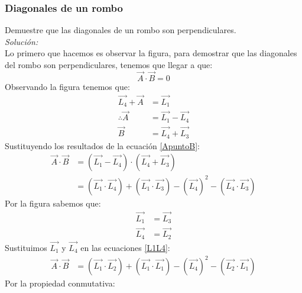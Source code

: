 \documentclass[12pt,openany]{book}
\begin{document}
			\subsubsection{Diagonales de un rombo}
				Demuestre que las diagonales de un rombo son perpendiculares.\\
				\noindent\textsl{Soluci\'on:}\\
				Lo primero que hacemos es observar la figura, para demostrar que las diagonales del rombo
				son perpendiculares, tenemos que llegar a que:
				$$
					\vec{A}\cdot\vec{B}=0
				$$
				Observando la figura tenemos que:
				\begin{equation}
					\begin{split}
						\vec{L_{4}}+\vec{A}&=\vec{L_{1}}\\
						\therefore \vec{A}&=\vec{L_{1}}-\vec{L_{4}}\\
						\vec{B}&=\vec{L_{4}}+\vec{L_{3}}
					\end{split}
					\label{ApuntoB}
				\end{equation}
				Sustituyendo los resultados de la ecuaci\'on \ref{ApuntoB}:
				\begin{equation}
					\begin{split}
					\vec{A}\cdot\vec{B}&=(\vec{L_{1}}-\vec{L_{4}})\cdot
																(\vec{L_{4}}+\vec{L_{3}}) \\
															&=(\vec{L_{1}}\cdot\vec{L_{4}})+
																(\vec{L_{1}}\cdot\vec{L_{3}})-
																(\vec{L_{4}})^{2}-
																(\vec{L_{4}}\cdot\vec{L_{3}})
					\end{split}
					\label{L1L4}
				\end{equation}
				Por la figura sabemos que:
				\begin{equation*}
					\begin{split}
						\vec{L_{1}}&=\vec{L_{3}} \\
						\vec{L_{4}}&=\vec{L_{2}}
					\end{split}
				\end{equation*}
				Sustituimos $\vec{L_{1}}$ y $\vec{L_{4}}$ en las ecuaciones \ref{L1L4}:
				\begin{equation*}
					\begin{split} 
					\vec{A}\cdot\vec{B}&=(\vec{L_{1}}\cdot\vec{L_{2}})+
																(\vec{L_{1}}\cdot\vec{L_{1}})-
																(\vec{L_{4}})^{2}-
																(\vec{L_{2}}\cdot\vec{L_{1}})
					\end{split}
				\end{equation*}
				Por la propiedad conmutativa:
\end{document}
